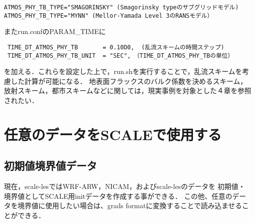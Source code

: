 \begin{verbatim}
ATMOS_PHY_TB_TYPE="SMAGORINSKY" (Smagorinsky typeのサブグリッドモデル)
ATMOS_PHY_TB_TYPE="MYNN" (Mellor-Yamada Level 3のRANSモデル）
\end{verbatim}

またrun.confのPARAM\_TIMEに

\begin{verbatim}
 TIME_DT_ATMOS_PHY_TB       = 0.10D0,  (乱流スキームの時間ステップ)
 TIME_DT_ATMOS_PHY_TB_UNIT  = "SEC",　（TIME_DT_ATMOS_PHY_TBの単位）
\end{verbatim}

を加える．これらを設定した上で，run.shを実行することで，乱流スキームを考慮した計算が可能になる．
地表面フラックスのバルク係数を決めるスキーム，放射スキーム，都市スキームなどに関しては，現実事例を対象とした４章を参照されたい．


\section{任意のデータをSCALEで使用する} \label{sec:adv_datainput}





\subsection{初期値境界値データ} \label{sec:adv_bnddata}

現在，scale-lesではWRF-ARW，NICAM，およびscale-lesのデータを
初期値・境界値としてSCALE用initデータを作成する事ができる．
この他、任意のデータを境界値に使用したい場合は、grads formatに変換することで読み込ませることができる．






